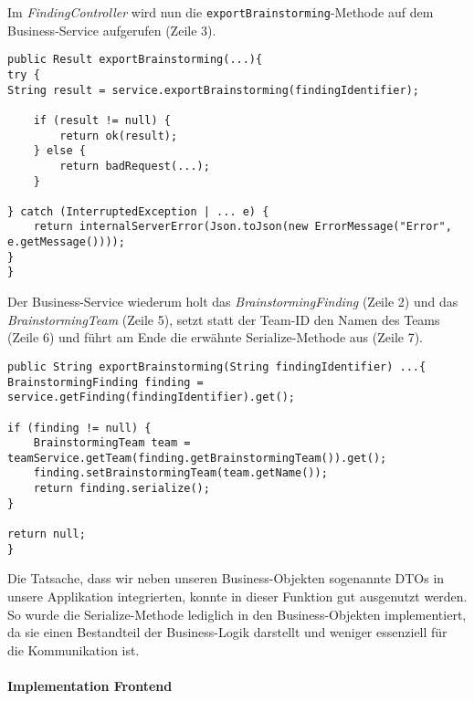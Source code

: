 Im \textit{FindingController} wird nun die \texttt{exportBrainstorming}-Methode auf dem Business-Service aufgerufen (Zeile 3).

\begin{lstlisting}[caption={Export-Methode im FindingController}, label=markdownFindingController]
public Result exportBrainstorming(...){
try {
String result = service.exportBrainstorming(findingIdentifier);

    if (result != null) {
        return ok(result);
    } else {
        return badRequest(...);
    }
    
} catch (InterruptedException | ... e) {
    return internalServerError(Json.toJson(new ErrorMessage("Error", e.getMessage())));
}
}
\end{lstlisting}

Der Business-Service wiederum holt das \textit{BrainstormingFinding} (Zeile 2) und das \textit{BrainstormingTeam} (Zeile 5), setzt statt der Team-ID den Namen des Teams (Zeile 6) und führt am Ende die erwähnte Serialize-Methode aus (Zeile 7). 

\begin{lstlisting}[caption={Export-Methode im FindingService}, label=markdownFindingService]
public String exportBrainstorming(String findingIdentifier) ...{
BrainstormingFinding finding = service.getFinding(findingIdentifier).get();

if (finding != null) {
    BrainstormingTeam team = teamService.getTeam(finding.getBrainstormingTeam()).get();
    finding.setBrainstormingTeam(team.getName());
    return finding.serialize();
}

return null;
}
\end{lstlisting}

Die Tatsache, dass wir neben unseren Business-Objekten sogenannte DTOs in unsere Applikation integrierten, konnte in dieser Funktion gut ausgenutzt werden. So wurde die Serialize-Methode lediglich in den Business-Objekten implementiert, da sie einen Bestandteil der Business-Logik darstellt und weniger essenziell für die Kommunikation ist.

\paragraph*{Implementation Frontend}~\\

